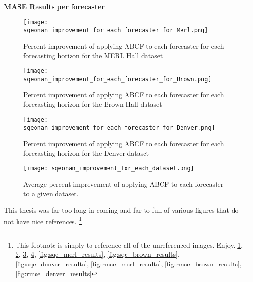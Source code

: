 \newpage

\bigskip 
\noindent \textbf{MASE Results per forecaster} \\


\begin{figure}
	\begin{center}
		\texttt{[image: sqeonan\_improvement\_for\_each\_forecaster\_for\_Merl.png]}
	\end{center}
	\caption{Percent improvement of applying ABCF to each forecaster for each forecasting horizon for the MERL Hall dataset}
	\label{fig:merl_sqeonan_improvement}
\end{figure}

\begin{figure}
	\begin{center}
		\texttt{[image: sqeonan\_improvement\_for\_each\_forecaster\_for\_Brown.png]}
	\end{center}
	\caption{Percent improvement of applying ABCF to each forecaster for each forecasting horizon for the Brown Hall dataset}
	\label{fig:brown_sqeonan_improvement}
\end{figure}

\begin{figure}
	\begin{center}
		\texttt{[image: sqeonan\_improvement\_for\_each\_forecaster\_for\_Denver.png]}
	\end{center}
	\caption{Percent improvement of applying ABCF to each forecaster for each forecasting horizon for the Denver dataset}
	\label{fig:denver_sqeonan_improvement}
\end{figure}



\begin{figure}
	\begin{center}
		\texttt{[image: sqeonan\_improvement\_for\_each\_dataset.png]}
	\end{center}
	\caption{Average percent improvement of applying ABCF to each forecaster to a given dataset.}
	\label{fig:sqeonan_improvement_all_dataset}
\end{figure}



\label{app:references}
This thesis was far too long in coming and far to full of various figures that do not have nice references.  
	\footnote{This footnote is simply to reference all of the unreferenced images.  Enjoy.
		\ref{fig:merl_sqeonan_improvement},
		\ref{fig:brown_sqeonan_improvement},
		\ref{fig:denver_sqeonan_improvement},
		\ref{fig:sqeonan_improvement_all_dataset},
		\ref{fig:sqe_merl_results},
		\ref{fig:sqe_brown_results},
		\ref{fig:sqe_denver_results},
		\ref{fig:rmse_merl_results},
		\ref{fig:rmse_brown_results},
		\ref{fig:rmse_denver_results}
	}